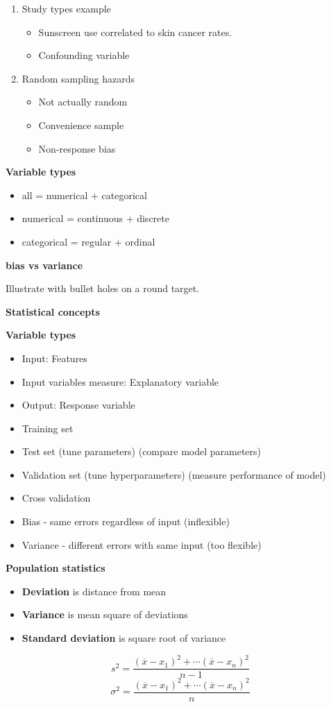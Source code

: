 \begin{enumerate}
\item Study types example
  \begin{itemize}
  \item Sunscreen use correlated to skin cancer rates.
  \item Confounding variable
  \end{itemize}

\item Random sampling hazards
  \begin{itemize}
  \item Not actually random
  \item Convenience sample
  \item Non-response bias
  \end{itemize}
\end{enumerate}

\textbf{Variable types}
\begin{itemize}
\item all = numerical + categorical
\item numerical = continuous + discrete
\item categorical = regular + ordinal
\end{itemize}

\textbf{bias vs variance}

Illustrate with bullet holes on a round target.


\textbf{Statistical concepts}

\textbf{Variable types}
\begin{itemize}
\item Input:  Features
\item Input variables measure:  Explanatory variable
\item Output: Response variable
\item Training set
\item Test set (tune parameters) (compare model parameters)
\item Validation set (tune hyperparameters) (measure performance of model)
\item Cross validation
\item Bias - same errors regardless of input (inflexible)
\item Variance - different errors with same input (too flexible)
\end{itemize}

\textbf{Population statistics}
\begin{itemize}
\item \textbf{Deviation} is distance from mean
\item \textbf{Variance} is mean square of deviations
\item \textbf{Standard deviation} is square root of variance
\end{itemize}
\begin{displaymath}
  s^2 = \frac{(\overline x - x_1)^2 + \dotsb (\overline x - x_n)^2}{n-1}
\end{displaymath}
\begin{displaymath}
  \sigma^2 = \frac{(\overline x - x_1)^2 + \dotsb (\overline x - x_n)^2}{n}
\end{displaymath}

